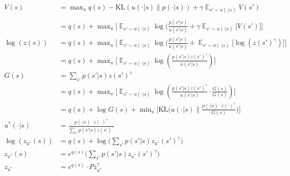 \begin{align}
V(s) &= \mathop{\text{max}}_{u} q(s) - \text{KL}(u(\cdot| s) \parallel p(\cdot | s)) + \gamma \mathop{\mathbb E}_{s' \sim u(\cdot | s)} V(s') \tag{1}\\
\\
&= q(s) + \mathop{\text{max}}_{u} \bigg[ \mathop{\mathbb E}_{s' \sim u(\cdot | s)} \log(\frac{p(s' | s) }{ u(s' | s)}+\gamma \mathop{\mathbb E}_{s' \sim u(\cdot | s)} \big[V(s')\big] \bigg] \tag{2}\\
\log(z(s)) &= q(s) + \mathop{\text{max}}_{u} \bigg[ \mathop{\mathbb E}_{s' \sim u(\cdot | s)} \log(\frac{p(s' | s) }{ u(s' | s)}+\mathop{\mathbb E}_{s' \sim u(\cdot | s)} \big[\log(z(s')^{\gamma})\big] \bigg] \tag{3}\\
&= q(s) + \mathop{\text{max}}_{u} \bigg[ \mathop{\mathbb E}_{s' \sim u(\cdot | s)} \log(\frac{p(s' | s)z(s')^{\gamma} }{ u(s' | s)} ) \bigg] \tag{4}\\
G(s) &= \sum_{s'} p(s' | s) z(s')^{\gamma} \tag{5}\\
&= q(s) + \mathop{\text{max}}_{u} \bigg[ \mathop{\mathbb E}_{s' \sim u(\cdot | s)} \log(\frac{p(s' | s)z(s')^{\gamma} }{ u(s' | s)} \cdot \frac{G(s)}{G(s)} ) \bigg] \tag{6}\\
&= q(s) + \log G(s) + \mathop{\text{min}}_{u} \bigg[\text{KL}\big(u(\cdot | s) \parallel \frac{p(\cdot | s)\cdot z(\cdot)^{\gamma}}{G(s)} \big) \bigg] \tag{7}\\
u^{* }(\cdot | s) &= \frac{p(\cdot | s)\cdot z(\cdot)^{\gamma}}{\sum_{s'} p(s' | s) z(s')^{\gamma}} \tag{8}\\
\log(z_{u^{* }}(s)) &= q(s) + \log \big(\sum_{s'} p(s' | s) z_{u^{* }}(s')^{\gamma}\big) \tag{9}\\
z_{u^{* }}(s) &= e^{q(s)}\big(\sum_{s'} p(s' | s) z_{u^{* }}(s')^{\gamma}\big) \tag{10}\\
z_{u^{* }} &= e^{q(s)}\cdot P z_{u^{* }}^{\gamma} \tag{11}\\
\end{align}

